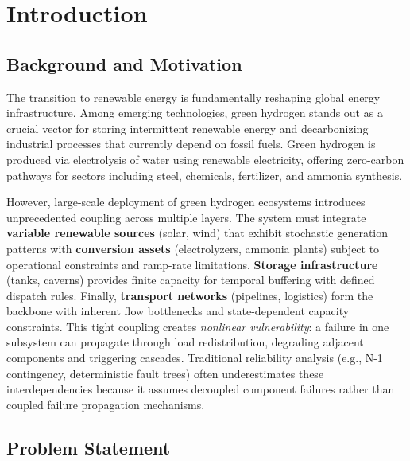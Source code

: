 \documentclass[12pt,a4paper,twoside]{report}
\begin{document}
\chapter{Introduction}

\section{Background and Motivation}

The transition to renewable energy is fundamentally reshaping global energy infrastructure. Among emerging technologies, green hydrogen stands out as a crucial vector for storing intermittent renewable energy and decarbonizing industrial processes that currently depend on fossil fuels. Green hydrogen is produced via electrolysis of water using renewable electricity, offering zero-carbon pathways for sectors including steel, chemicals, fertilizer, and ammonia synthesis.

However, large-scale deployment of green hydrogen ecosystems introduces unprecedented coupling across multiple layers. The system must integrate \textbf{variable renewable sources} (solar, wind) that exhibit stochastic generation patterns with \textbf{conversion assets} (electrolyzers, ammonia plants) subject to operational constraints and ramp-rate limitations. \textbf{Storage infrastructure} (tanks, caverns) provides finite capacity for temporal buffering with defined dispatch rules. Finally, \textbf{transport networks} (pipelines, logistics) form the backbone with inherent flow bottlenecks and state-dependent capacity constraints. This tight coupling creates \textit{nonlinear vulnerability}: a failure in one subsystem can propagate through load redistribution, degrading adjacent components and triggering cascades. Traditional reliability analysis (e.g., N-1 contingency, deterministic fault trees) often underestimates these interdependencies because it assumes decoupled component failures rather than coupled failure propagation mechanisms.

\section{Problem Statement}
\end{document}
